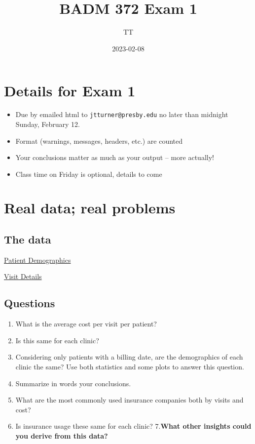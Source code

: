 \documentclass[
]{book}
\title{BADM 372 Exam 1}
\author{TT}
\date{2023-02-08}
\providecommand{\tightlist}{%
  \setlength{\itemsep}{0pt}\setlength{\parskip}{0pt}}
\begin{document}
\maketitle

{
\setcounter{tocdepth}{1}
\tableofcontents
}
\hypertarget{details-for-exam-1}{%
\chapter{Details for Exam 1}\label{details-for-exam-1}}

\begin{itemize}
\tightlist
\item
  Due by emailed html to \texttt{jtturner@presby.edu} no later than midnight Sunday, February 12.
\item
  Format (warnings, messages, headers, etc.) are counted
\item
  Your conclusions matter as much as your output -- more actually!
\item
  Class time on Friday is optional, details to come
\end{itemize}

\hypertarget{real-data-real-problems}{%
\chapter{Real data; real problems}\label{real-data-real-problems}}

\hypertarget{the-data}{%
\section{The data}\label{the-data}}

\href{https://drive.google.com/file/d/1xdZJrkzG_FNxVUFwrGm6b1HGtUWA510w/view?usp=sharing}{Patient Demographics}

\href{https://drive.google.com/file/d/1ighQbbB3okKcJBBPuOTKKPFoQFYaX255/view?usp=sharing}{Visit Details}

\hypertarget{questions}{%
\section{Questions}\label{questions}}

\begin{enumerate}
\def\labelenumi{\arabic{enumi}.}
\tightlist
\item
  What is the average cost per visit per patient?\\
\item
  Is this same for each clinic?
\item
  Considering only patients with a billing date, are the demographics of each clinic the same? Use both statistics and some plots to answer this question.\\
\item
  Summarize in words your conclusions.
\item
  What are the most commonly used insurance companies both by visits and cost?
\item
  Is insurance usage these same for each clinic?
  7.\textbf{What other insights could you derive from this data?}
\end{enumerate}
\end{document}
